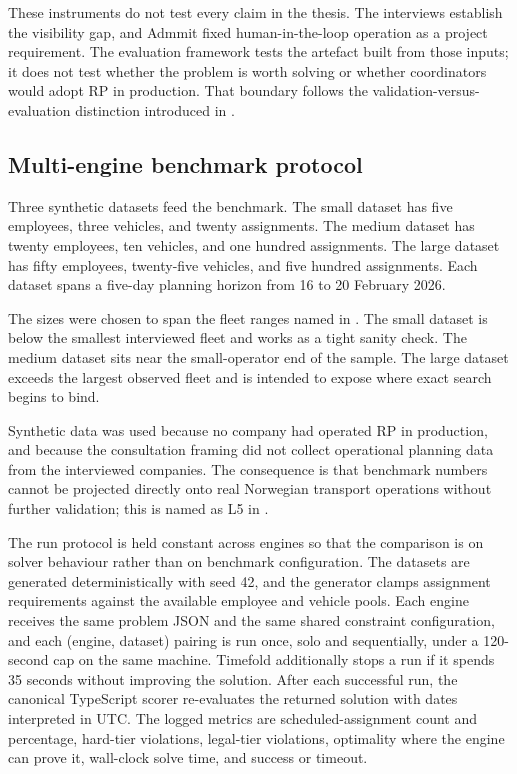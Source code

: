 These instruments do not test every claim in the thesis. The interviews establish the visibility gap, and Admmit fixed human-in-the-loop operation as a project requirement. The evaluation framework tests the artefact built from those inputs; it does not test whether the problem is worth solving or whether coordinators would adopt RP in production. That boundary follows the validation-versus-evaluation distinction introduced in .

\subsection{Multi-engine benchmark protocol}
\label{sec:eval-benchmark}

Three synthetic datasets feed the benchmark. The small dataset has five employees, three vehicles, and twenty assignments. The medium dataset has twenty employees, ten vehicles, and one hundred assignments. The large dataset has fifty employees, twenty-five vehicles, and five hundred assignments. Each dataset spans a five-day planning horizon from 16 to 20 February 2026.

The sizes were chosen to span the fleet ranges named in . The small dataset is below the smallest interviewed fleet and works as a tight sanity check. The medium dataset sits near the small-operator end of the sample. The large dataset exceeds the largest observed fleet and is intended to expose where exact search begins to bind.

Synthetic data was used because no company had operated RP in production, and because the consultation framing did not collect operational planning data from the interviewed companies. The consequence is that benchmark numbers cannot be projected directly onto real Norwegian transport operations without further validation; this is named as L5 in .

The run protocol is held constant across engines so that the comparison is on solver behaviour rather than on benchmark configuration. The datasets are generated deterministically with seed 42, and the generator clamps assignment requirements against the available employee and vehicle pools. Each engine receives the same problem JSON and the same shared constraint configuration, and each (engine, dataset) pairing is run once, solo and sequentially, under a 120-second cap on the same machine. Timefold additionally stops a run if it spends 35 seconds without improving the solution. After each successful run, the canonical TypeScript scorer re-evaluates the returned solution with dates interpreted in UTC. The logged metrics are scheduled-assignment count and percentage, hard-tier violations, legal-tier violations, optimality where the engine can prove it, wall-clock solve time, and success or timeout.

